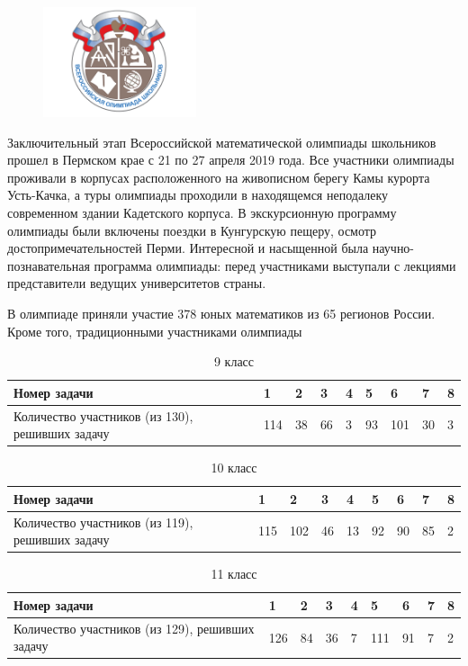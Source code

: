 \begin{multicols}{2}
	\begin{figure}[H]
		\includegraphics[width=0.4\textwidth]{pic4}
		\centering
	\end{figure}
Заключительный этап Всероссийской математической олимпиады школьников прошел в
Пермском крае с 21 по 27 апреля 2019 года. Все
участники олимпиады проживали в корпусах
расположенного на живописном берегу Камы
курорта Усть-Качка, а туры олимпиады проходили в находящемся неподалеку современном
здании Кадетского корпуса. В экскурсионную
программу олимпиады были включены поездки в Кунгурскую пещеру, осмотр достопримечательностей Перми. Интересной и насыщенной была научно-познавательная программа
олимпиады: перед участниками выступали с
лекциями представители ведущих университетов страны.

В олимпиаде приняли участие 378 юных
математиков из 65 регионов России. Кроме
того, традиционными участниками олимпиады
\vspace{-2em}
\begin{table}[H]
	\centering
	\caption{9 класс}
	\begin{tabular}{|M{17mm}|M{4mm}|M{4mm}|M{4mm}|M{4mm}|M{4mm}|M{4mm}|M{4mm}|M{4mm}|}
		\hline
		Номер задачи & 1 & 2 & 3 & 4 & 5 & 6 & 7 & 8 \\	
		\hline
		Количество участников (из 130), решивших задачу & 114
		& 38 & 66 & 3 & 93 & 101 & 30 & 3 \\
		\hline
	\end{tabular}
\end{table}
\vspace{-2em}
\begin{table}[H]
	\centering
	\caption{10 класс}
	\begin{tabular}{|M{17mm}|M{4mm}|M{4mm}|M{4mm}|M{4mm}|M{4mm}|M{4mm}|M{4mm}|M{4mm}|}
		\hline
		Номер задачи & 1 & 2 & 3 & 4 & 5 & 6 & 7 & 8 \\	
		\hline
		Количество участников (из 119), решивших задачу & 115
		& 102 & 46 & 13 & 92 & 90 & 85 & 2 \\
		\hline
	\end{tabular}
\end{table}
\vspace{-2em}
\begin{table}[H]
	\centering
	\caption{11 класс}
	\begin{tabular}{|M{17mm}|M{4mm}|M{4mm}|M{4mm}|M{4mm}|M{4mm}|M{4mm}|M{4mm}|M{4mm}|}
		\hline
		Номер задачи & 1 & 2 & 3 & 4 & 5 & 6 & 7 & 8 \\	
		\hline
		Количество участников (из 129), решивших задачу & 126
		& 84 & 36 & 7 & 111 & 91 & 7 & 2 \\
		\hline
	\end{tabular}
\end{table}

\end{multicols}
